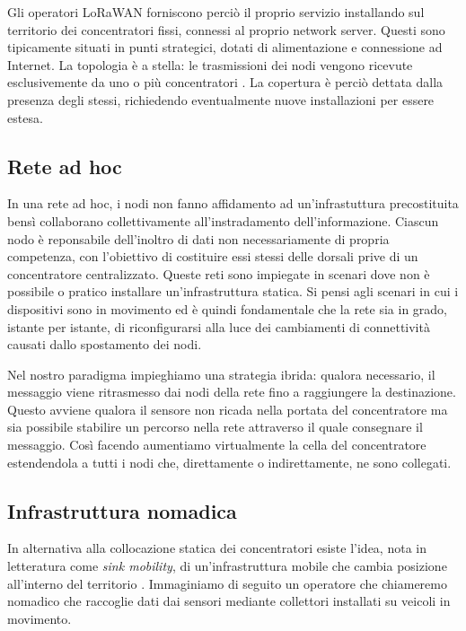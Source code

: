 \documentclass[a4paper,11pt]{article}
\theoremstyle{definition}
\begin{document}
Gli operatori LoRaWAN forniscono perciò il proprio servizio installando sul territorio dei concentratori fissi, connessi al proprio network server. Questi sono tipicamente situati in punti strategici, dotati di alimentazione e connessione ad Internet. La topologia è a stella: le trasmissioni dei nodi vengono ricevute esclusivemente da uno o più concentratori \cite{loraspec}. La copertura è perciò dettata dalla presenza degli stessi, richiedendo eventualmente nuove installazioni per essere estesa.

\subsection{Rete ad hoc}

In una rete ad hoc, i nodi non fanno affidamento ad un'infrastuttura precostituita bensì collaborano collettivamente all'instradamento dell'informazione. Ciascun nodo è reponsabile dell'inoltro di dati non necessariamente di propria competenza, con l'obiettivo di costituire essi stessi delle dorsali prive di un concentratore centralizzato. Queste reti sono impiegate in scenari dove non è possibile o pratico installare un'infrastruttura statica. Si pensi agli scenari in cui i dispositivi sono in movimento ed è quindi fondamentale che la rete sia in grado, istante per istante, di riconfigurarsi alla luce dei cambiamenti di connettività causati dallo spostamento dei nodi.

Nel nostro paradigma impieghiamo una strategia ibrida: qualora necessario, il messaggio viene ritrasmesso dai nodi della rete fino a raggiungere la destinazione. Questo avviene qualora il sensore non ricada nella portata del concentratore ma sia possibile stabilire un percorso nella rete attraverso il quale consegnare il messaggio. Così facendo aumentiamo virtualmente la cella del concentratore estendendola a tutti i nodi che, direttamente o indirettamente, ne sono collegati.

\subsection{Infrastruttura nomadica}

In alternativa alla collocazione statica dei concentratori esiste l'idea, nota in letteratura come \emph{sink mobility}, di un'infrastruttura mobile che cambia posizione all'interno del territorio \cite{sinkmob}. Immaginiamo di seguito un operatore che chiameremo nomadico che raccoglie dati dai sensori mediante collettori installati su veicoli in movimento.
\end{document}
